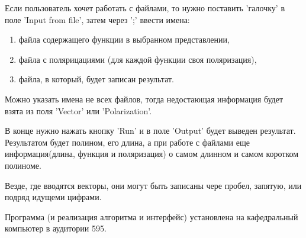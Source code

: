 \documentclass[a4paper, 14pt]{extarticle}
\begin{document}
Если пользователь хочет работать с файлами, то нужно поставить 'галочку' в поле 'Input from file', затем через ';' ввести имена:
\begin{enumerate}
\item файла содержащего функции в выбранном представлении,
\item файла с полярицациями (для каждой функции своя поляризация),
\item файла, в который, будет записан результат.
\end{enumerate}
Можно указать имена не всех файлов, тогда недостающая информация будет взята из поля 'Vector' или 'Polarization'.

В конце нужно нажать кнопку 'Run' и в поле 'Output' будет выведен результат.
Результатом будет полином, его длина, а при работе с файлами еще информация(длина, функция и поляризация) о самом длинном
и самом коротком полиноме.

Везде, где вводятся векторы, они могут быть записаны чере пробел, запятую, или подряд идущеми цифрами.

Программа (и реализация алгоритма и интерфейс) установлена на кафедральный компьютер в аудитории 595.
\end{document}
